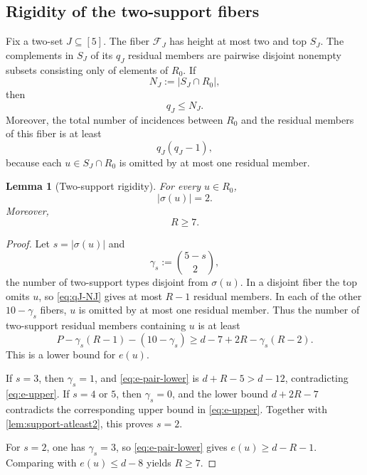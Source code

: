 \documentclass[11pt,reqno]{amsart}
\numberwithin{equation}{section}
\newtheorem{lemma}[lemma]{Lemma}
\theoremstyle{definition}
\theoremstyle{remark}
\newcommand{\F}{\mathcal{F}}
\newcommand{\1}{\mathbf{1}}
\newcommand{\abs}[1]{\left|#1\right|}
\begin{document}
\subsection{Rigidity of the two-support fibers}

Fix a two-set \(J\subseteq[5]\).  The fiber \(\F_J\) has height at most two and top \(S_J\).  The complements in \(S_J\) of its \(q_J\) residual members are pairwise disjoint nonempty subsets consisting only of elements of \(R_0\).  If
\[
N_J:=\abs{S_J\cap R_0},
\]
then
\begin{equation}\label{eq:qJ-NJ}
q_J\le N_J.
\end{equation}
Moreover, the total number of incidences between \(R_0\) and the residual members of this fiber is at least
\begin{equation}\label{eq:qJ-incidence}
q_J(q_J-1),
\end{equation}
because each \(u\in S_J\cap R_0\) is omitted by at most one residual member.

\begin{lemma}[Two-support rigidity]\label{lem:two-support-rigidity}
For every \(u\in R_0\),
\begin{equation}\label{eq:sigma-two}
\abs{\sigma(u)}=2.
\end{equation}
Moreover,
\begin{equation}\label{eq:R-atleast7}
R\ge7.
\end{equation}
\end{lemma}

\begin{proof}
Let \(s=\abs{\sigma(u)}\) and
\[
\gamma_s:=\binom{5-s}{2},
\]
the number of two-support types disjoint from \(\sigma(u)\).  In a disjoint fiber the top omits \(u\), so \cref{eq:qJ-NJ} gives at most \(R-1\) residual members.  In each of the other \(10-\gamma_s\) fibers, \(u\) is omitted by at most one residual member.  Thus the number of two-support residual members containing \(u\) is at least
\begin{equation}\label{eq:e-pair-lower}
P-\gamma_s(R-1)-(10-\gamma_s)
\ge d-7+2R-\gamma_s(R-2).
\end{equation}
This is a lower bound for \(e(u)\).

If \(s=3\), then \(\gamma_s=1\), and \cref{eq:e-pair-lower} is \(d+R-5>d-12\), contradicting \cref{eq:e-upper}.  If \(s=4\) or \(5\), then \(\gamma_s=0\), and the lower bound \(d+2R-7\) contradicts the corresponding upper bound in \cref{eq:e-upper}.  Together with \cref{lem:support-atleast2}, this proves \(s=2\).

For \(s=2\), one has \(\gamma_s=3\), so \cref{eq:e-pair-lower} gives \(e(u)\ge d-R-1\).  Comparing with \(e(u)\le d-8\) yields \(R\ge7\).
\end{proof}
\end{document}
